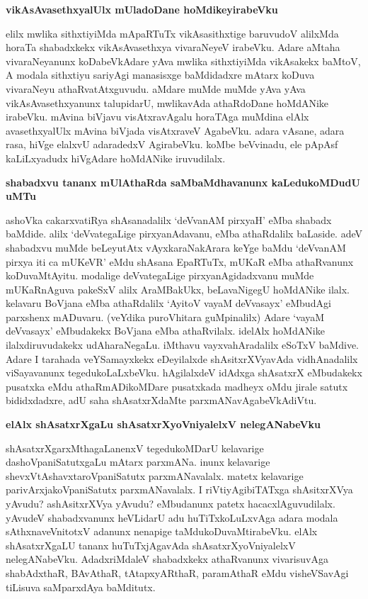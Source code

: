 {\bigskip
\noindent
{\large\bf vikAsAvasethxyalUlx mUladoDane hoMdikeyirabeVku}}\label{page178}
\medskip

\noindent
elilx mwlika sithxtiyiMda mApaRTuTx vikAsasithxtige baruvudoV alilxMda horaTa shabadxkekx vikAsAvasethxya vivaraNeyeV irabeVku. Adare aMtaha vivaraNeyanunx koDabeVkAdare yAva mwlika sithxtiyiMda vikAsakekx baMtoV, A modala sithxtiyu sariyAgi manasisxge baMdidadxre mAtarx koDuva vivaraNeyu athaRvatAtxguvudu. aMdare muMde muMde yAva yAva vikAsAvasethxyanunx talupidarU, mwlikavAda athaRdoDane hoMdANike irabeVku. mAvina biVjavu visAtxravAgalu horaTAga muMdina elAlx avasethxyalUlx mAvina biVjada visAtxraveV AgabeVku. adara vAsane, adara rasa, hiVge elalxvU adaradedxV AgirabeVku. koMbe beVvinadu, ele pApAsf kaLiLxyadudx hiVgAdare hoMdANike iruvudilalx.

{\bigskip
\noindent
{\large\bf shabadxvu tananx mUlAthaRda saMbaMdhavanunx kaLedukoMDudU uMTu}}
\medskip

\noindent
ashoVka cakarxvatiRya shAsanadalilx `deVvanAM pirxyaH' eMba shabadx baMdide. alilx `deVvategaLige pirxyanAdavanu, eMba athaRdalilx baLaside. adeV shabadxvu muMde beLeyutAtx vAyxkaraNakArara keYge baMdu `deVvanAM pirxya iti ca mUKeVR' eMdu shAsana EpaRTuTx, mUKaR eMba athaRvanunx koDuvaMtAyitu. modalige deVvategaLige pirxyanAgidadxvanu muMde mUKaRnAguva pakeSxV alilx AraMBakUkx, beLavaNigegU hoMdANike ilalx. kelavaru BoVjana eMba athaRdalilx `AyitoV vayaM deVvasayx' eMbudAgi parxshenx mADuvaru. (veYdika puroVhitara guMpinalilx) Adare `vayaM deVvasayx' eMbudakekx BoVjana eMba athaRvilalx. idelAlx hoMdANike ilalxdiruvudakekx udAharaNegaLu. iMthavu vayxvahAradalilx eSoTxV baMdive. Adare I tarahada veYSamayxkekx eDeyilalxde shAsitxrXVyavAda vidhAnadalilx viSayavanunx tegedukoLaLxbeVku. hAgilalxdeV idAdxga shAsatxrX eMbudakekx pusatxka eMdu athaRmADikoMDare pusatxkada madheyx oMdu jirale satutx bididxdadxre, adU saha shAsatxrXdaMte parxmANavAgabeVkAdiVtu.

{\bigskip
\noindent
{\large\bf elAlx shAsatxrXgaLu shAsatxrXyoVniyalelxV nelegANabeVku}}\label{page179}
\medskip

\noindent
shAsatxrXgarxMthagaLanenxV tegedukoMDarU kelavarige dashoVpaniSatutxgaLu mAtarx parxmANa. inunx kelavarige shevxVtAshavxtaroVpaniSatutx parxmANavalalx. matetx kelavarige parivArxjakoVpaniSatutx parxmANavalalx. I riVtiyAgibiTATxga shAsitxrXVya yAvudu? ashAsitxrXVya yAvudu? eMbudanunx patetx hacacxlAguvudilalx. yAvudeV shabadxvanunx heVLidarU adu huTiTxkoLuLxvAga adara modala sAthxnaveVnitotxV adanunx nenapige taMdukoDuvaMtirabeVku. elAlx shAsatxrXgaLU tananx huTuTxjAgavAda shAsatxrXyoVniyalelxV nelegANabeVku. AdadxriMdaleV shabadxkekx athaRvanunx vivarisuvAga shabAdxthaR, BAvAthaR, tAtapxyARthaR, paramAthaR eMdu visheVSavAgi tiLisuva saMparxdAya baMditutx.

